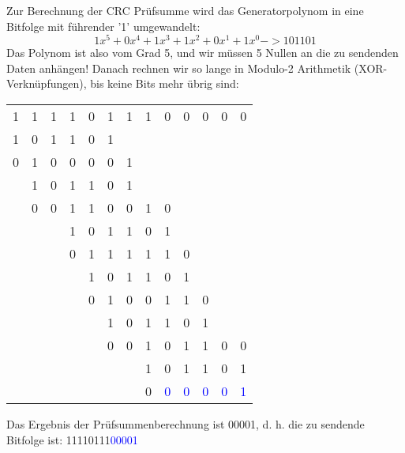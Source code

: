 
Zur Berechnung der CRC Prüfsumme wird das Generatorpolynom in eine Bitfolge mit führender '1' umgewandelt:
\[1x^5 + 0x^4 + 1x^3 + 1x^2 + 0x^1 + 1x^0 ->  101101\]
Das Polynom ist also vom Grad 5, und wir müssen 5 Nullen an die zu sendenden Daten anhängen!
Danach rechnen wir so lange in Modulo-2 Arithmetik (XOR-Verknüpfungen), bis keine Bits mehr übrig sind:

\begin{center}
    \begin{tabular}{c c c c c c c c c c c c c}
        1 & 1 & 1 & 1 & 0 & 1 & 1 & 1 & 0 & 0 & 0 & 0 & 0 \tabularnewline
        1 & 0 & 1 & 1 & 0 & 1 & & & & & & & \tabularnewline
        \hline
        0 & 1 & 0 & 0 & 0 & 0 & 1 & & & & & & \tabularnewline
        & 1 & 0 & 1 & 1 & 0 & 1 & & & & & & \tabularnewline
        \hline
        & 0 & 0 & 1 & 1 & 0 & 0 & 1 & 0 & & & & \tabularnewline
        & & & 1 & 0 & 1 & 1 & 0 & 1 & & & & \tabularnewline
        \hline
        & & & 0 & 1 & 1 & 1 & 1 & 1 & 0 & & & \tabularnewline
        & & & & 1 & 0 & 1 & 1 & 0 & 1 & & & \tabularnewline
        \hline
        & & & & 0 & 1 & 0 & 0 & 1 & 1 & 0 & & \tabularnewline
        & & & & & 1 & 0 & 1 & 1 & 0 & 1 & & \tabularnewline
        \hline
        & & & & & 0 & 0 & 1 & 0 & 1 & 1 & 0 & 0 \tabularnewline
        & & & & & & & 1 & 0 & 1 & 1 & 0 & 1 \tabularnewline
        \hline
        & & & & & & & 0 & \textcolor{blue}{0} & \textcolor{blue}{0} & \textcolor{blue}{0} & \textcolor{blue}{0} & \textcolor{blue}{1} \tabularnewline
    \end{tabular}
\end{center}

Das Ergebnis der Prüfsummenberechnung ist 00001, d. h. die zu sendende Bitfolge ist: 11110111\textcolor{blue}{00001}